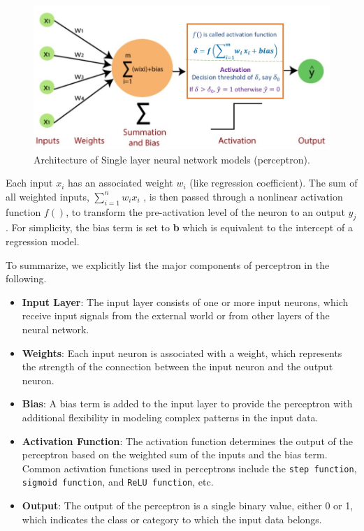 \documentclass[
]{book}
\begin{document}
\begin{figure}

{\centering \includegraphics[width=0.7\linewidth]{img07/w07-PerceptronNetwork} 

}

\caption{Architecture of Single layer neural network models (perceptron).}\label{fig:unnamed-chunk-142}
\end{figure}

Each input \(x_i\) has an associated weight \(w_i\) (like regression coefficient). The sum of all weighted inputs, \(\sum_{i=1}^n w_ix_i\) , is then passed through a nonlinear activation function \(f()\), to transform the pre-activation level of the neuron to an output \(y_j\). For simplicity, the bias term is set to \textbf{b} which is equivalent to the intercept of a regression model.

To summarize, we explicitly list the major components of perceptron in the following.

\begin{itemize}
\item
  \textbf{Input Layer}: The input layer consists of one or more input neurons, which receive input signals from the external world or from other layers of the neural network.
\item
  \textbf{Weights}: Each input neuron is associated with a weight, which represents the strength of the connection between the input neuron and the output neuron.
\item
  \textbf{Bias}: A bias term is added to the input layer to provide the perceptron with additional flexibility in modeling complex patterns in the input data.
\item
  \textbf{Activation Function}: The activation function determines the output of the perceptron based on the weighted sum of the inputs and the bias term. Common activation functions used in perceptrons include the \texttt{step\ function}, \texttt{sigmoid\ function}, and \texttt{ReLU\ function}, etc.
\item
  \textbf{Output}: The output of the perceptron is a single binary value, either 0 or 1, which indicates the class or category to which the input data belongs.
\end{itemize}
\end{document}
